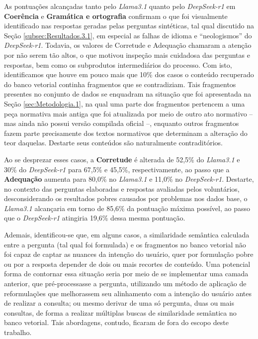 As pontuações alcançadas tanto pelo \textit{Llama3.1} quanto pelo \textit{DeepSeek-r1} em \textbf{Coerência} e \textbf{Gramática e ortografia} confirmam o que foi visualmente identificado nas respostas geradas pelas perguntas sintéticas, tal qual discutido na Seção \ref{subsec:Resultados.3.1}, em especial as falhas de idioma e ``neologismos'' do \textit{DeepSeek-r1}. Todavia, os valores de Corretude e Adequação chamaram a atenção por não serem tão altos, o que motivou inspeção mais cuidadosa das perguntas e respostas, bem como os subprodutos intermediários do processo. Com isto, identificamos que houve em pouco mais que 10\% dos casos o conteúdo recuperado do banco vetorial continha fragmentos que se contradiziam. Tais fragmentos presentes no conjunto de dados se enquadram na situação que foi apresentada na Seção \ref{sec:Metodologia.1}, na qual uma parte dos fragmentos pertencem a uma peça normativa mais antiga que foi atualizada por meio de outro ato normativo -- mas ainda não possui versão compilada oficial --, enquanto outros fragmentos fazem parte precisamente dos textos normativos que determinam a alteração do teor daquelas. Destarte seus conteúdos são naturalmente contraditórios.

Ao se desprezar esses casos, a \textbf{Corretude} é alterada de 52,5\% do \textit{Llama3.1} e 30\% do \textit{DeepSeek-r1} para 67,5\% e 45,5\%, respectivamente, ao passo que a \textbf{Adequação} aumenta para 80,0\% no \textit{Llama3.1} e 11,0\% no \textit{DeepSeek-r1}. Destarte, no contexto das perguntas elaboradas e respostas avaliadas pelos voluntários, desconsiderando os resultados pobres causados por problemas nos dados base, o \textit{Llama3.1} alcançaria em torno de 85,6\% da pontuação máxima possível, ao passo que o \textit{DeepSeek-r1} atingiria 19,6\% dessa mesma pontuação.

Ademais, identificou-se que, em alguns casos,  a similaridade semântica calculada entre a pergunta (tal qual foi formulada) e os fragmentos no banco vetorial não foi capaz de captar as nuances da intenção do usuário, quer por formulação pobre ou por a resposta depender de dois ou mais recortes de conteúdo. Uma potencial forma de contornar essa situação seria por meio de se implementar uma camada anterior, que pré-processasse a pergunta, utilizando um método de aplicação de reformulações que melhorassem seu alinhamento com a intenção do usuário antes de realizar a consulta; ou mesmo derivar de uma só pergunta, duas ou mais consultas, de forma a realizar múltiplas buscas de similaridade semântica no banco vetorial. Tais abordagens, contudo, ficaram de fora do escopo deste trabalho.

